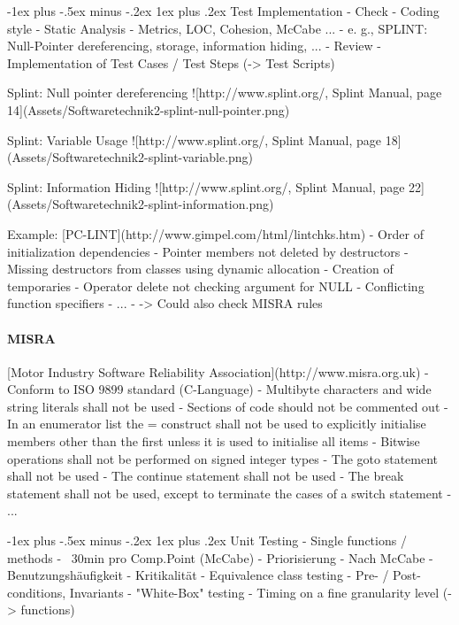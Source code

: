 \documentclass[a4paper]{article}
\makeatletter
\renewcommand{\subsubsection}{\@startsection{subsubsection}{3}{0mm}%
                                {-1ex plus -.5ex minus -.2ex}%
                                {1ex plus .2ex}%
                                {\normalfont\small\bfseries}}
\makeatother
\begin{document}
\begin{multicols}{3}
  
  \subsubsection{Test Implementation}
  - Check
      - Coding style
      - Static Analysis
         - Metrics, LOC, Cohesion, McCabe ...
         - e. g., SPLINT: Null-Pointer
            dereferencing, storage, information
            hiding, ...
  - Review
      - Implementation of Test Cases / Test Steps
         (-> Test Scripts)
  
  
  Splint: Null pointer dereferencing
  ![http://www.splint.org/, Splint Manual, page 14](Assets/Softwaretechnik2-splint-null-pointer.png)
  
  Splint: Variable Usage
  ![http://www.splint.org/, Splint Manual, page 18](Assets/Softwaretechnik2-splint-variable.png)
  
  Splint: Information Hiding
  ![http://www.splint.org/, Splint Manual, page 22](Assets/Softwaretechnik2-splint-information.png)
  
  Example: [PC-LINT](http://www.gimpel.com/html/lintchks.htm)
  - Order of initialization dependencies
  - Pointer members not deleted by destructors
  - Missing destructors from classes using dynamic allocation
  - Creation of temporaries
  - Operator delete not checking argument for NULL
  - Conflicting function specifiers
  - ...
  - -> Could also check MISRA rules
  
  \paragraph{MISRA}
  [Motor Industry Software Reliability Association](http://www.misra.org.uk)
  - Conform to ISO 9899 standard (C-Language)
  - Multibyte characters and wide string literals shall not be used
  - Sections of code should not be commented out
  - In an enumerator list the = construct shall not be used to explicitly initialise members other than the first unless it is used to initialise all items
  - Bitwise operations shall not be performed on signed integer types
  - The goto statement shall not be used
  - The continue statement shall not be used
  - The break statement shall not be used, except to terminate the cases of a switch statement
  - ...
  
  
  \subsubsection{Unit Testing}
  - Single functions / methods
      - ~30min pro Comp.Point (McCabe)
      - Priorisierung
         - Nach McCabe
         - Benutzungshäufigkeit
         - Kritikalität
  - Equivalence class testing
  - Pre- / Post-conditions, Invariants
  - "White-Box" testing
  - Timing on a fine granularity level (-> functions)
  

\end{multicols}
\end{document}
